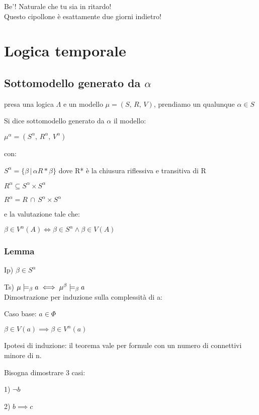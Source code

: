 \begin{savequote}[50mm]
Be'! Naturale che tu sia in ritardo! \\
Questo cipollone è esattamente due giorni indietro! 
 \end{savequote}


\chapter{	Logica temporale}


\section{Sottomodello generato da $\alpha$}

presa una logica $\Lambda$ e un modello $\mu=(S,\, R,\, V)$, prendiamo
un qualunque $\alpha\in S$

Si dice sottomodello generato da $\alpha$ il modello:

$\mu^{\alpha}=(S^{\alpha},\, R^{\alpha},\, V^{\alpha})$

con:

$S^{\alpha}=\{\beta\,|\,\alpha R*\beta\}$ dove R{*} è la chiusura
riflessiva e transitiva di R

$R^{\alpha}\subseteq S^{\alpha}\times S^{\alpha}$

$R^{\alpha}=R\,\cap\, S^{\alpha}\times S^{\alpha}$

e la valutazione tale che:

$\beta\in V^{\alpha}(A)\iff\beta\in S^{\alpha}\wedge\beta\in V(A)$


\subsection{Lemma}

Ip) $\beta\in S^{\alpha}$

Ts) $\mu\models_{\beta}a\iff\mu^{\beta}\models_{\beta}a$\\
Dimostrazione per induzione sulla complessità di a:

Caso base: $a\in\Phi$

$\beta\in V(a)\implies\beta\in V^{\alpha}(a)$

Ipotesi di induzione: il teorema vale per formule con un numero di
connettivi minore di n.

Bisogna dimostrare 3 casi:

1) $\neg b$

2) $b\implies c$

